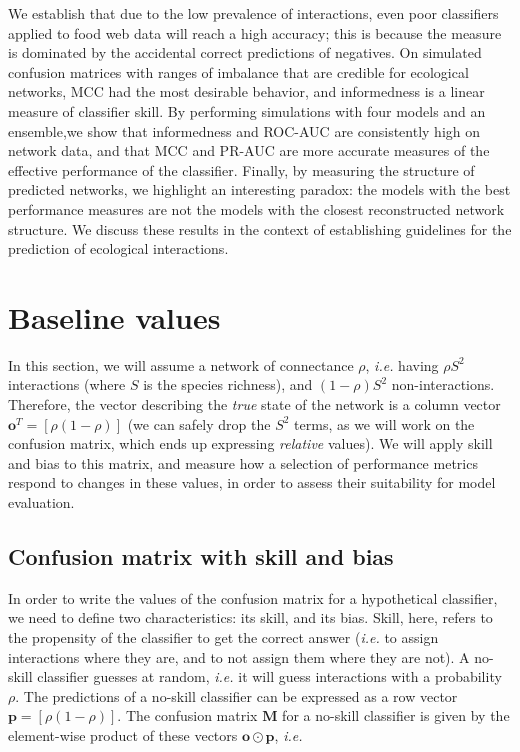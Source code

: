 \documentclass[11pt]{article}
\begin{document}
We establish that due to the low prevalence of interactions, even poor
classifiers applied to food web data will reach a high accuracy; this is
because the measure is dominated by the accidental correct predictions
of negatives. On simulated confusion matrices with ranges of imbalance
that are credible for ecological networks, MCC had the most desirable
behavior, and informedness is a linear measure of classifier skill. By
performing simulations with four models and an ensemble,we show that
informedness and ROC-AUC are consistently high on network data, and that
MCC and PR-AUC are more accurate measures of the effective performance
of the classifier. Finally, by measuring the structure of predicted
networks, we highlight an interesting paradox: the models with the best
performance measures are not the models with the closest reconstructed
network structure. We discuss these results in the context of
establishing guidelines for the prediction of ecological interactions.

\hypertarget{baseline-values}{%
\section{Baseline values}\label{baseline-values}}

In this section, we will assume a network of connectance \(\rho\),
\emph{i.e.} having \(\rho S^2\) interactions (where \(S\) is the species
richness), and \((1-\rho) S^2\) non-interactions. Therefore, the vector
describing the \emph{true} state of the network is a column vector
\(\mathbf{o}^T = [\rho (1-\rho)]\) (we can safely drop the \(S^2\)
terms, as we will work on the confusion matrix, which ends up expressing
\emph{relative} values). We will apply skill and bias to this matrix,
and measure how a selection of performance metrics respond to changes in
these values, in order to assess their suitability for model evaluation.

\hypertarget{confusion-matrix-with-skill-and-bias}{%
\subsection{Confusion matrix with skill and
bias}\label{confusion-matrix-with-skill-and-bias}}

In order to write the values of the confusion matrix for a hypothetical
classifier, we need to define two characteristics: its skill, and its
bias. Skill, here, refers to the propensity of the classifier to get the
correct answer (\emph{i.e.} to assign interactions where they are, and
to not assign them where they are not). A no-skill classifier guesses at
random, \emph{i.e.} it will guess interactions with a probability
\(\rho\). The predictions of a no-skill classifier can be expressed as a
row vector \(\mathbf{p} = [\rho (1-\rho)]\). The confusion matrix
\(\mathbf{M}\) for a no-skill classifier is given by the element-wise
product of these vectors \(\mathbf{o} \odot \mathbf{p}\), \emph{i.e.}
\end{document}
